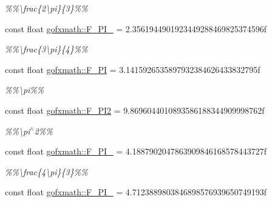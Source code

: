 \begin{DoxyCompactItemize}
\begin{DoxyCompactList}\small\item\em \%\%\textbackslash{}frac\{2\textbackslash{}pi\}\{3\}\%\% \end{DoxyCompactList}\item 
\hypertarget{group___scalar_math_consts_ga0c35a004d833cc1dfbee7acbccaab09c}{}const float \hyperlink{group___scalar_math_consts_ga0c35a004d833cc1dfbee7acbccaab09c}{gofxmath\+::\+F\+\_\+P\+I\+\_} = 2.\+3561944901923449288469825374596f\label{group___scalar_math_consts_ga0c35a004d833cc1dfbee7acbccaab09c}

\begin{DoxyCompactList}\small\item\em \%\%\textbackslash{}frac\{3\textbackslash{}pi\}\{4\}\%\% \end{DoxyCompactList}\item 
\hypertarget{group___scalar_math_consts_gafafb6dc6f6a78d4380d623b37686827b}{}const float \hyperlink{group___scalar_math_consts_gafafb6dc6f6a78d4380d623b37686827b}{gofxmath\+::\+F\+\_\+\+P\+I} = 3.\+1415926535897932384626433832795f\label{group___scalar_math_consts_gafafb6dc6f6a78d4380d623b37686827b}

\begin{DoxyCompactList}\small\item\em \%\%\textbackslash{}pi\%\% \end{DoxyCompactList}\item 
\hypertarget{group___scalar_math_consts_gaf59322d3dc0e90033f44d217583e9610}{}const float \hyperlink{group___scalar_math_consts_gaf59322d3dc0e90033f44d217583e9610}{gofxmath\+::\+F\+\_\+\+P\+I2} = 9.\+8696044010893586188344909998762f\label{group___scalar_math_consts_gaf59322d3dc0e90033f44d217583e9610}

\begin{DoxyCompactList}\small\item\em \%\%\textbackslash{}pi$^\wedge$2\%\% \end{DoxyCompactList}\item 
\hypertarget{group___scalar_math_consts_ga66ec3d4c6fb8f4879f419676a5cd1ae3}{}const float \hyperlink{group___scalar_math_consts_ga66ec3d4c6fb8f4879f419676a5cd1ae3}{gofxmath\+::\+F\+\_\+P\+I\+\_} = 4.\+1887902047863909846168578443727f\label{group___scalar_math_consts_ga66ec3d4c6fb8f4879f419676a5cd1ae3}

\begin{DoxyCompactList}\small\item\em \%\%\textbackslash{}frac\{4\textbackslash{}pi\}\{3\}\%\% \end{DoxyCompactList}\item 
\hypertarget{group___scalar_math_consts_ga7f5e7bc15600bd01690e89244107f84f}{}const float \hyperlink{group___scalar_math_consts_ga7f5e7bc15600bd01690e89244107f84f}{gofxmath\+::\+F\+\_\+P\+I\+\_} = 4.\+7123889803846898576939650749193f\label{group___scalar_math_consts_ga7f5e7bc15600bd01690e89244107f84f}


\end{DoxyCompactItemize}
